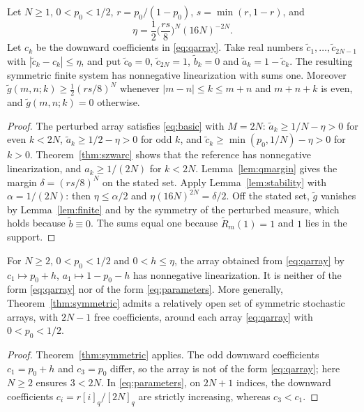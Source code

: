 \begin{theorem}\label{thm:symmetric}
Let $N\geq1$, $0<p_0<1/2$, $r=p_0/(1-p_0)$, $s=\min(r,1-r)$, and
\[
\eta=\frac12\Big(\frac{rs}8\Big)^N(16N)^{-2N}.
\]
Let $c_k$ be the downward coefficients in \eqref{eq:qarray}. Take real numbers $\widetilde c_1,\ldots,\widetilde c_{2N-1}$ with $|\widetilde c_k-c_k|\leq\eta$, and put $\widetilde c_0=0$, $\widetilde c_{2N}=1$, $\widetilde b_k=0$ and $\widetilde a_k=1-\widetilde c_k$. The resulting symmetric finite system has nonnegative linearization with sums one. Moreover $\widetilde g(m,n;k)\geq\frac12(rs/8)^N$ whenever $|m-n|\leq k\leq m+n$ and $m+n+k$ is even, and $\widetilde g(m,n;k)=0$ otherwise.
\end{theorem}
\begin{proof}
The perturbed array satisfies \eqref{eq:basic} with $M=2N$: $\widetilde a_k\geq1/N-\eta>0$ for even $k<2N$, $\widetilde a_k\geq1/2-\eta>0$ for odd $k$, and $\widetilde c_k\geq\min(p_0,1/N)-\eta>0$ for $k>0$. Theorem~\ref{thm:szwarc} shows that the reference has nonnegative linearization, and $a_k\geq1/(2N)$ for $k<2N$. Lemma~\ref{lem:qmargin} gives the margin $\delta=(rs/8)^N$ on the stated set. Apply Lemma~\ref{lem:stability} with $\alpha=1/(2N)$: then $\eta\leq\alpha/2$ and $\eta(16N)^{2N}=\delta/2$. Off the stated set, $\widetilde g$ vanishes by Lemma~\ref{lem:finite} and by the symmetry of the perturbed measure, which holds because $\widetilde b\equiv0$. The sums equal one because $\widetilde R_m(1)=1$ and $1$ lies in the support.
\end{proof}

\begin{corollary}\label{cor:symmetric-new}
For $N\geq2$, $0<p_0<1/2$ and $0<h\leq\eta$, the array obtained from \eqref{eq:qarray} by $c_1\mapsto p_0+h$, $a_1\mapsto1-p_0-h$ has nonnegative linearization. It is neither of the form \eqref{eq:qarray} nor of the form \eqref{eq:parameters}. More generally, Theorem~\ref{thm:symmetric} admits a relatively open set of symmetric stochastic arrays, with $2N-1$ free coefficients, around each array \eqref{eq:qarray} with $0<p_0<1/2$.
\end{corollary}
\begin{proof}
Theorem~\ref{thm:symmetric} applies. The odd downward coefficients $c_1=p_0+h$ and $c_3=p_0$ differ, so the array is not of the form \eqref{eq:qarray}; here $N\geq2$ ensures $3<2N$. In \eqref{eq:parameters}, on $2N+1$ indices, the downward coefficients $c_i=r[i]_q/[2N]_q$ are strictly increasing, whereas $c_3<c_1$.
\end{proof}

